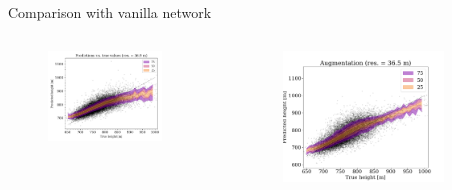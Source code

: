 \documentclass{beamer}
\begin{document}
\begin{frame}{Comparison with vanilla network}
\begin{columns}
    \begin{figure}
        \centering
            \includegraphics[width=0.85\textwidth]{figures/long_run_vanilla.png}
    \end{figure}
    \begin{figure}
        \centering
        \includegraphics[width=0.85\textwidth]{figures/aug_scaled.png}
    \end{figure}

\end{columns}
\end{frame}


\end{document}
